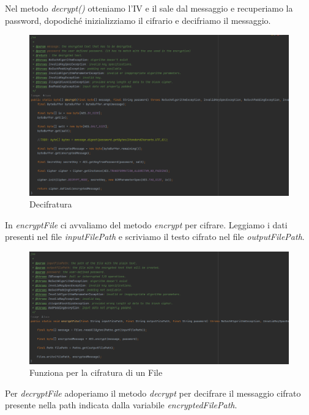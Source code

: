 \textsf{\small Nel metodo \emph{decrypt()} otteniamo l'IV e il sale dal messaggio e recuperiamo la password, dopodiché inizializziamo il cifrario e decifriamo il messaggio.} %

\begin{figure}[H]
	\centering
	\includegraphics[width=1\textwidth, height=1\textheight, keepaspectratio]{./images/code/java/decrypt.PNG}
	\caption{Decifratura}
	\label{fig:decrypt_java}
\end{figure}

\textsf{\small In \emph{encryptFile} ci avvaliamo del metodo \emph{encrypt} per cifrare. Leggiamo i dati presenti nel file \emph{inputFilePath} e scriviamo il testo cifrato nel file \emph{outputFilePath}.} %

\begin{figure}[H]
	\centering
	\includegraphics[width=1\textwidth, height=1\textheight, keepaspectratio]{./images/code/java/encryptFile.PNG}
	\caption{Funziona per la cifratura di un File}
	\label{fig:encryptFile}
\end{figure}

\textsf{\small Per \emph{decryptFile} adoperiamo il metodo \emph{decrypt} per decifrare il messaggio cifrato presente nella path indicata dalla variabile \emph{encryptedFilePath}.} %

